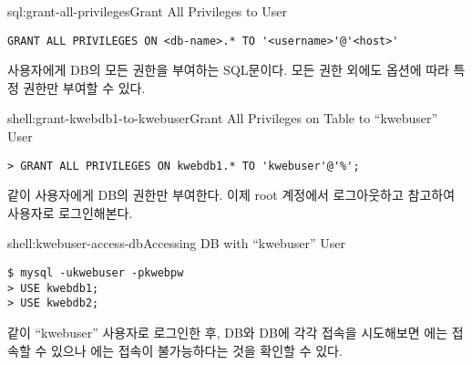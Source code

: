 \begin{sqlenv}{sql:grant-all-privileges}{Grant All Privileges to User}\begin{verbatim}
GRANT ALL PRIVILEGES ON <db-name>.* TO '<username>'@'<host>'
\end{verbatim}
\end{sqlenv}

\는 사용자에게  DB의 모든 권한을 부여하는 SQL문이다. 모든 권한 외에도 옵션에 따라 특정 권한만 부여할 수 있다.

\begin{shellenv}{shell:grant-kwebdb1-to-kwebuser}{Grant All Privileges on  Table to ``kwebuser'' User}\begin{verbatim}
> GRANT ALL PRIVILEGES ON kwebdb1.* TO 'kwebuser'@'%';
\end{verbatim}
\end{shellenv}

\와 같이  사용자에게  DB의 권한만 부여한다. 이제 root 계정에서 로그아웃하고 \을 참고하여  사용자로 로그인해본다.

\begin{shellenv}{shell:kwebuser-access-db}{Accessing DB with ``kwebuser'' User}\begin{verbatim}
$ mysql -ukwebuser -pkwebpw
> USE kwebdb1;
> USE kwebdb2;
\end{verbatim}
\end{shellenv}

\와 같이 ``kwebuser'' 사용자로 로그인한 후,  DB와  DB에 각각 접속을 시도해보면 에는 접속할 수 있으나 에는 접속이 불가능하다는 것을 확인할 수 있다.
